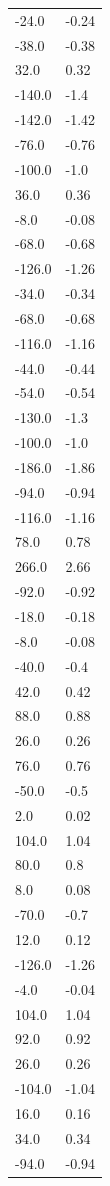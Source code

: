\begin{longtable}{ll}
-24.0 & -0.24 \\
-38.0 & -0.38 \\
32.0 & 0.32 \\
-140.0 & -1.4 \\
-142.0 & -1.42 \\
-76.0 & -0.76 \\
-100.0 & -1.0 \\
36.0 & 0.36 \\
-8.0 & -0.08 \\
-68.0 & -0.68 \\
-126.0 & -1.26 \\
-34.0 & -0.34 \\
-68.0 & -0.68 \\
-116.0 & -1.16 \\
-44.0 & -0.44 \\
-54.0 & -0.54 \\
-130.0 & -1.3 \\
-100.0 & -1.0 \\
-186.0 & -1.86 \\
-94.0 & -0.94 \\
-116.0 & -1.16 \\
78.0 & 0.78 \\
266.0 & 2.66 \\
-92.0 & -0.92 \\
-18.0 & -0.18 \\
-8.0 & -0.08 \\
-40.0 & -0.4 \\
42.0 & 0.42 \\
88.0 & 0.88 \\
26.0 & 0.26 \\
76.0 & 0.76 \\
-50.0 & -0.5 \\
2.0 & 0.02 \\
104.0 & 1.04 \\
80.0 & 0.8 \\
8.0 & 0.08 \\
-70.0 & -0.7 \\
12.0 & 0.12 \\
-126.0 & -1.26 \\
-4.0 & -0.04 \\
104.0 & 1.04 \\
92.0 & 0.92 \\
26.0 & 0.26 \\
-104.0 & -1.04 \\
16.0 & 0.16 \\
34.0 & 0.34 \\
-94.0 & -0.94 \\

\end{longtable}
